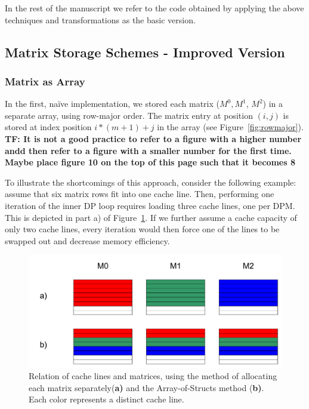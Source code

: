 \documentclass[runningheads,a4paper]{llncs}
\begin{document}
In the rest of the manuscript we refer to the code obtained by applying the above techniques and transformations as the basic version.

\subsection{Matrix Storage Schemes - Improved Version}
\label{sec:caching}

\subsubsection{Matrix as Array}
In the first, na\"ive implementation, we stored each matrix ($M^0, M^1$, $M^2$) in a separate array, using row-major order.
The matrix entry at position $(i,j)$ is stored at index position $i*(m+1)+j$ in the array (see Figure~\ref{fig:rowmajor}).
\textbf{TF: It is not a good practice to refer to a figure with a higher number andd then refer to a figure with a smaller number for the first time. Maybe place figure 10 on the top of this page such that it becomes 8}

To illustrate the shortcomings of this approach, consider the following example: assume that six matrix rows fit into one cache line.
Then, performing one iteration of the inner DP loop requires loading three cache lines, one per DPM.
This is depicted in part a) of Figure~\ref{fig:cachelines}.
If we further assume a cache capacity of only two cache lines,
every iteration would then force one of the lines to be swapped out and decrease memory efficiency.

\begin{figure}
\centering
\includegraphics[width=\textwidth]{images/cachelines.pdf}
\caption{Relation of cache lines and matrices, using the method of allocating each matrix separately(\textbf{a)} and the Array-of-Structs method (\textbf{b)}.
Each color represents a distinct cache line.}
\label{fig:cachelines}
\end{figure}
\end{document}
